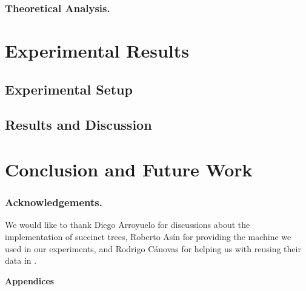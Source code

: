 \documentclass[runningheads]{llncs}
\begin{document}
\subsubsection{Theoretical Analysis.}
\label{subsec:theoreticalAnalysis}


%


\section{Experimental Results}
\label{sec:exps}


\subsection{Experimental Setup}
\label{subsec:experimentalSetup}


\subsection{Results and Discussion}
\label{subsec:resultsDiscussion}



\section{Conclusion and Future Work}
\label{sec:conclusion}


\subsubsection*{Acknowledgements.}

We would like to thank Diego Arroyuelo for discussions about the
implementation of succinct trees, Roberto As\'{i}n for providing the machine
we used in our experiments, and Rodrigo C\'{a}novas
for helping us with reusing their data in
\cite{Navarro:2014:FFS:2620785.2601073}.




\newpage
\appendix
\begin{center}
  \bf \Large Appendices
\end{center}



\end{document}
